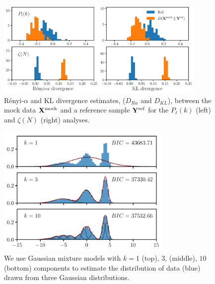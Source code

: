 \documentclass[12pt, letterpaper, preprint]{aastex}
\begin{document}
\begin{figure}
\begin{center}
\includegraphics[width=0.9\textwidth]{figs/kNNdiverg_Gauss.pdf}
\caption{R\'enyi-$\alpha$ and KL divergence estimates, ($D_{R\alpha}$ and $D_{KL}$), 
between the mock data ${\bf X}^\mathrm{mock}$ and a reference sample 
${\bf Y}^\mathrm{ref}$ for the $P_\ell(k)$ (left) and $\zeta(N)$ (right) analyses.}
\label{fig:div_gauss}
\end{center}
\end{figure}


\begin{figure}
\begin{center}
\includegraphics[width=0.75\textwidth]{figs/GMM_pedagog.pdf}
\caption{We use Gaussian mixture models with $k = 1$ (top), $3$, (middle), $10$ (bottom) 
    components to estimate the distribution of data (blue) drawn from three Gaussian distributions.
}
\label{fig:gmf_ped}
\end{center}
\end{figure}
\end{document}
